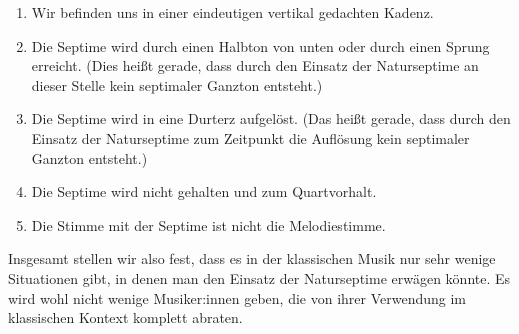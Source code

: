 \begin{enumerate}
\item Wir befinden uns in einer eindeutigen vertikal gedachten Kadenz.
\item Die Septime wird durch einen Halbton von unten oder durch einen Sprung
  erreicht. (Dies heißt gerade, dass durch den Einsatz der Naturseptime an
  dieser Stelle kein septimaler Ganzton entsteht.)
\item Die Septime wird in eine Durterz aufgelöst. (Das heißt gerade, dass durch
  den Einsatz der Naturseptime zum Zeitpunkt die Auflösung kein septimaler
  Ganzton entsteht.)
\item Die Septime wird nicht gehalten und zum Quartvorhalt.
\item Die Stimme mit der Septime ist nicht die Melodiestimme.
\end{enumerate}

Insgesamt stellen wir also fest, dass es in der klassischen Musik nur sehr
wenige Situationen gibt, in denen man den Einsatz der Naturseptime erwägen
könnte.  Es wird wohl nicht wenige Musiker:innen geben, die von ihrer Verwendung
im klassischen Kontext komplett abraten. 

